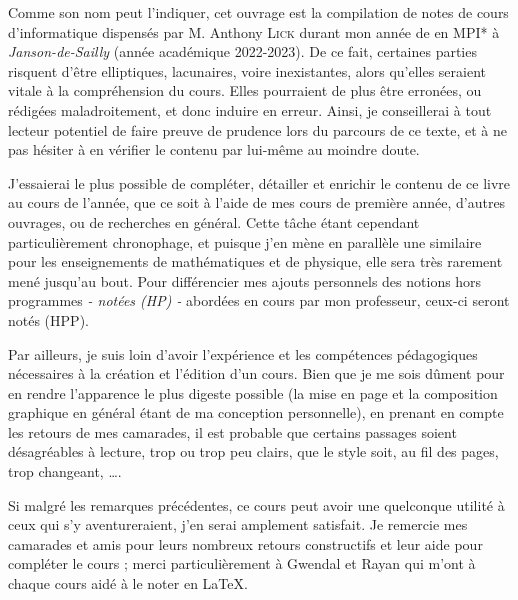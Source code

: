 \documentclass[a4paper,french,bookmarks]{book}
\begin{document}
    \newline\newline\newline
    
    \begin{center}
        \begin{minipage}{0.85\linewidth}
            \large \qquad Comme son nom peut l'indiquer, cet ouvrage est la compilation de notes de cours d'informatique dispensés par M. Anthony
            \textsc{Lick} durant mon année de  en \textsf{MPI*} à \emph{Janson-de-Sailly} (année académique 2022-2023). De ce fait,
            certaines parties risquent d'être elliptiques, lacunaires, voire inexistantes, alors qu'elles seraient vitale à la compréhension du
            cours. Elles pourraient de plus être erronées, ou rédigées maladroitement, et donc induire en erreur. Ainsi, je conseillerai à tout
            lecteur potentiel de faire preuve de prudence lors du parcours de ce texte, et à ne pas hésiter à en vérifier le contenu par lui-même
            au moindre doute.\newline
            
            J'essaierai le plus possible de compléter, détailler et enrichir le contenu de ce livre au cours de l'année, que ce soit à l'aide de
            mes cours de première année, d'autres ouvrages, ou de recherches en général. Cette tâche étant cependant particulièrement chronophage,
            et puisque j'en mène en parallèle une similaire pour les enseignements de mathématiques et de physique, elle sera très rarement mené
            jusqu'au bout. Pour différencier mes ajouts personnels des notions hors programmes \emph{- notées (HP) -} abordées en cours par mon
            professeur, ceux-ci seront notés (HPP).\newline
            
            Par ailleurs, je suis loin d'avoir l'expérience et les compétences pédagogiques nécessaires à la création et l'édition d'un cours. Bien
            que je me sois dûment pour en rendre l'apparence le plus digeste possible (la mise en page et la composition graphique en général étant
            de ma conception personnelle), en prenant en compte les retours de mes camarades, il est probable que certains passages soient
            désagréables à lecture, trop  ou trop peu clairs, que le style soit, au fil des pages, trop changeant, \etc
            \dots.\newline
    
            Si malgré les remarques précédentes, ce cours peut avoir une quelconque utilité à ceux qui s'y aventureraient, j'en serai amplement
            satisfait. Je remercie mes camarades et amis pour leurs nombreux retours constructifs et leur aide pour compléter le cours ; merci
            particulièrement à Gwendal et Rayan qui m'ont à chaque cours aidé à le noter en \LaTeX. \newline\newline\newline\text{}
        \end{minipage}
    \end{center}
    
\end{document}

